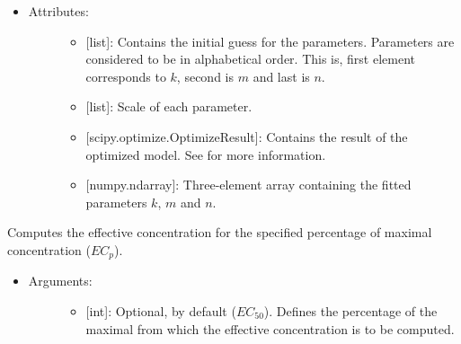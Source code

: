 \documentclass[letterpaper,10pt,english]{sphinxmanual}
\begin{document}
\begin{fulllineitems}
\begin{itemize}
\begin{description}
\begin{itemize}
\end{itemize}

\end{description}

\end{itemize}
\begin{itemize}
\item {} \begin{description}
\item[{Attributes:}] \leavevmode\begin{itemize}
\item {} 
 {[}list{]}: Contains the initial guess for the parameters.
Parameters are considered to be in alphabetical order. This
is, first element corresponds to \(k\), second is
\(m\) and last is \(n\).

\item {} 
 {[}list{]}: Scale of each parameter.

\item {} 
 {[}scipy.optimize.OptimizeResult{]}: Contains the result
of the optimized model. See  for more
information.

\item {} 
 {[}numpy.ndarray{]}: Three-element array containing the
fitted parameters \(k\), \(m\) and \(n\).

\end{itemize}

\end{description}

\end{itemize}

\begin{fulllineitems}
\label{\detokenize{models:data_tools.models.DoseResponse.ec}}
Computes the effective concentration for the specified
percentage of maximal concentration (\(EC_{p}\)).
\begin{itemize}
\item {} \begin{description}
\item[{Arguments:}] \leavevmode\begin{itemize}
\item {} 
 {[}int{]}: Optional,  by default (\(EC_{50}\)).
Defines the percentage of the maximal from which the
effective concentration is to be computed.


\end{itemize}
\end{description}
\end{itemize}
\end{fulllineitems}
\end{fulllineitems}
\end{document}
